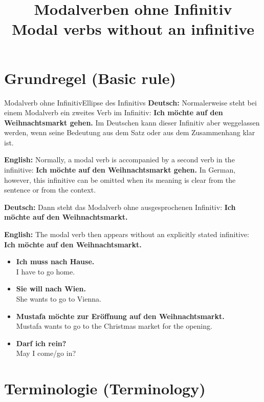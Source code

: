 \documentclass[a4paper,11pt]{article}
\title{Modalverben ohne Infinitiv\\{\large Modal verbs without an infinitive}}
\date{}
\newcommand{\GermanText}[1]{\textbf{Deutsch: }#1\par}
\newcommand{\EnglishText}[1]{{\small\color{SoftGray}\textbf{English: }#1\par}}
\newcommand{\ExampleItem}[2]{\item \textbf{#1}\\{\small\color{SoftGray}#2}}
\begin{document}
    \maketitle
    \tableofcontents
    \newpage

    \section{Grundregel \textnormal{(Basic rule)}}

        \begin{grammarentry}{Modalverb ohne Infinitiv}{Ellipse des Infinitivs}
            \GermanText{Normalerweise steht bei einem Modalverb ein zweites Verb im Infinitiv: \textbf{Ich möchte auf den Weihnachtsmarkt gehen.} Im Deutschen kann dieser Infinitiv aber weggelassen werden, wenn seine Bedeutung aus dem Satz oder aus dem Zusammenhang klar ist.}
            \EnglishText{Normally, a modal verb is accompanied by a second verb in the infinitive: \textbf{Ich möchte auf den Weihnachtsmarkt gehen.} In German, however, this infinitive can be omitted when its meaning is clear from the sentence or from the context.}

            \GermanText{Dann steht das Modalverb ohne ausgesprochenen Infinitiv: \textbf{Ich möchte auf den Weihnachtsmarkt.}}
            \EnglishText{The modal verb then appears without an explicitly stated infinitive: \textbf{Ich möchte auf den Weihnachtsmarkt.}}
        \end{grammarentry}

        \begin{exbox}
            \begin{itemize}
                \ExampleItem{Ich muss nach Hause.}{I have to go home.}
                \ExampleItem{Sie will nach Wien.}{She wants to go to Vienna.}
                \ExampleItem{Mustafa möchte zur Eröffnung auf den Weihnachtsmarkt.}{Mustafa wants to go to the Christmas market for the opening.}
                \ExampleItem{Darf ich rein?}{May I come/go in?}
            \end{itemize}
        \end{exbox}

    \section{Terminologie \textnormal{(Terminology)}}
\end{document}
